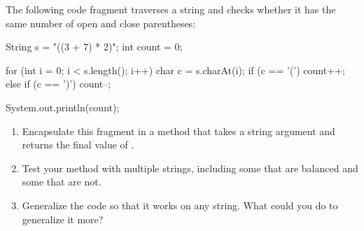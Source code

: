 \begin{exercise}  %


The following code fragment traverses a string and checks whether it has the same number of open and close parentheses:

\begin{code}
String s = "((3 + 7) * 2)";
int count = 0;

for (int i = 0; i < s.length(); i++) {
    char c = s.charAt(i);
    if (c == '(') {
        count++;
    } else if (c == ')') {
        count--;
    }
}

System.out.println(count);
\end{code}

\begin{enumerate}

\item Encapsulate this fragment in a method that takes a string argument and returns the final value of .

\item Test your method with multiple strings, including some that are balanced and some that are not.

\item Generalize the code so that it works on any string. What could you do to generalize it more?

\end{enumerate}

\end{exercise}
